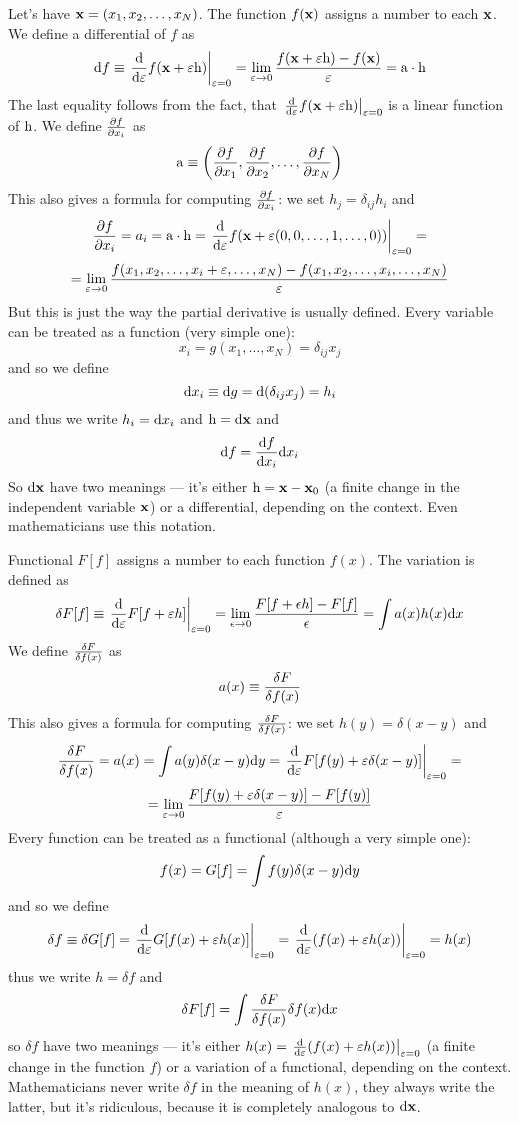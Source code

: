 \def\h{{\rm h}}
\def\a{{\rm a}}
Let's have ${\bf x}=(x_1,x_2,\dots,x_N)$. The function $f({\bf x})$ assigns a number
to each ${\bf x}$. We define a differential of $f$ as
$$\d f\equiv \left.{\d\over\d\varepsilon}f(\x+\varepsilon\h)
\right|_{\varepsilon=0}
=\lim_{\varepsilon\to0}
{f(\x+\varepsilon\h)-f(\x)\over\varepsilon}=\a\cdot\h$$
The last equality follows from the fact, that
$\left.{\d\over\d\varepsilon}f(\x+\varepsilon\h) \right|_{\varepsilon=0}$ is a
linear function of $\h$.
We define ${\partial f\over\partial x_i}$ as
$$\a\equiv\left({\partial f\over\partial x_1},{\partial f\over\partial x_2},
\dots,{\partial f\over\partial x_N}\right)$$
This also gives a formula for computing ${\partial f\over\partial x_i}$: we
set $h_j=\delta_{ij}h_i$ and
$${\partial f\over\partial x_i}=a_i=\a\cdot\h=\left.{\d\over\d\varepsilon}
f(\x+\varepsilon(0,0,\dots,1,\dots,0))\right|_{\varepsilon=0}=$$
$$=\lim_{\varepsilon\to0}
{f(x_1,x_2,\dots,x_i+\varepsilon,\dots,x_N)-f(x_1,x_2,\dots,x_i,\dots,x_N)
\over\varepsilon}$$
But this is just the way the partial derivative is usually defined.
Every variable can be treated as a function (very simple one):
$$x_i=g(x_1,\dots,x_N)=\delta_{ij}x_j$$
and so we define
$${\rm d} x_i\equiv{\rm d} g={\rm d}(\delta_{ij}x_j)=h_i$$
and thus we write $h_i={\rm d} x_i$ and $\h=\d\x$ and 
$${\rm d} f={{\rm d} f\over{\rm d} x_i}{\rm d} x_i$$
So ${\rm d}{\bf x}$ have two meanings --- it's either $\h=\x-\x_0$ (a finite change in
the independent variable ${\bf x}$) or a differential,
depending on the context. Even mathematicians use this notation.

Functional $F[f]$ assigns a number to each function $f(x)$. The variation is
defined as 
$$\delta F[f]\equiv\left.{{\rm d}\over{\rm d}\varepsilon}F[f+\varepsilon h]
\right|_{\varepsilon=0}=\lim_{\epsilon\to0}{F[f+\epsilon h]-F[f]\over\epsilon}=
\int a(x)h(x){\rm d} x$$
We define ${\delta F\over\delta f(x)}$ as
$$a(x)\equiv{\delta F\over\delta f(x)}$$
This also gives a formula for computing ${\delta F\over\delta f(x)}$: we
set $h(y)=\delta(x-y)$ and
$${\delta F\over\delta f(x)}=a(x)=\int a(y)\delta(x-y){\rm d} y=
\left.{{\rm d}\over{\rm d}\varepsilon}F[f(y)+\varepsilon\delta(x-y)]
\right|_{\varepsilon=0}=$$
$$=\lim_{\varepsilon\to0}
{F[f(y)+\varepsilon\delta(x-y)]-F[f(y)]\over\varepsilon}$$
Every function can be treated as a functional (although a very simple one):
$$f(x)=G[f]=\int f(y)\delta(x-y){\rm d} y$$
and so we define
$$\delta f\equiv\delta G[f]=
\left.{{\rm d}\over{\rm d}\varepsilon}G[f(x)+\varepsilon h(x)]
\right|_{\varepsilon=0}=
\left.{{\rm d}\over{\rm d}\varepsilon}(f(x)+\varepsilon h(x))
\right|_{\varepsilon=0}=
h(x)$$
thus we write $h=\delta f$ and
$$\delta F[f]=\int {\delta F\over\delta f(x)}\delta f(x){\rm d} x$$
so $\delta f$ have two meanings --- it's either 
$h(x)=\left.{{\rm d}\over{\rm d}\varepsilon}(f(x)+\varepsilon h(x))
\right|_{\varepsilon=0}$
(a finite change in the
function $f$) or a variation of a functional, depending on the context.
Mathematicians never write $\delta f$ in the meaning of $h(x)$, they always
write the latter, but it's ridiculous, because it is completely analogous to
${\rm d}{\bf x}$.


